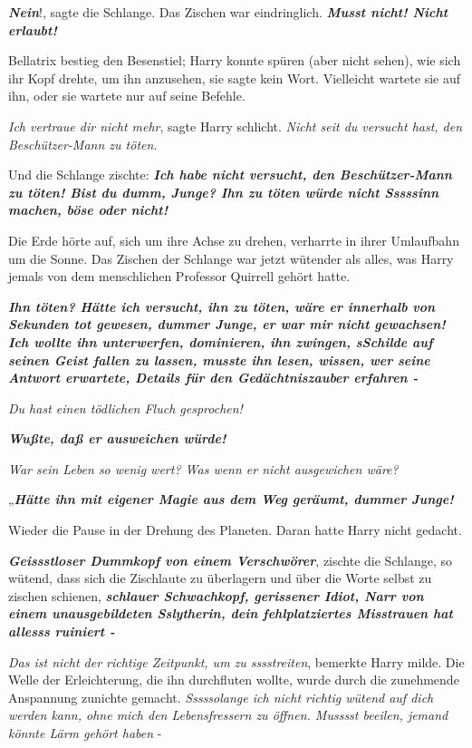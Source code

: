 \glqq{}\textbf{\emph{Nein}}!\grqq{}, sagte die Schlange. Das Zischen war
eindringlich. \glqq{}\textbf{\emph{Musst nicht! Nicht erlaubt!}}\grqq{}

Bellatrix bestieg den Besenstiel; Harry konnte spüren (aber nicht sehen), wie
sich ihr Kopf drehte, um ihn anzusehen, sie sagte kein Wort. Vielleicht wartete
sie auf ihn, oder sie wartete nur auf seine Befehle.

\glqq{}\emph{Ich vertraue dir nicht mehr}\grqq{}, sagte Harry schlicht. \glqq{}
\emph{Nicht seit du versucht hast, den Beschützer-Mann zu töten.}\grqq{}

Und die Schlange zischte: \glqq{}\textbf{\emph{Ich habe nicht versucht, den
Beschützer-Mann zu töten! Bist du dumm, Junge? Ihn zu töten würde nicht Sssssinn
machen, böse oder nicht!}}\grqq{}

Die Erde hörte auf, sich um ihre Achse zu drehen, verharrte in ihrer Umlaufbahn
um die Sonne. Das Zischen der Schlange war jetzt wütender als alles, was Harry
jemals von dem menschlichen Professor Quirrell gehört hatte.

\glqq{}\textbf{\emph{Ihn töten? Hätte ich versucht, ihn zu töten, wäre er
innerhalb von Sekunden tot gewesen, dummer Junge, er war mir nicht gewachsen!
Ich wollte ihn unterwerfen, dominieren, ihn zwingen, sSchilde auf seinen Geist
fallen zu lassen, musste ihn lesen, wissen, wer seine Antwort erwartete, Details
für den Gedächtniszauber erfahren -}}\grqq{}

\glqq{}\emph{Du hast einen tödlichen Fluch gesprochen!}\grqq{}

\glqq{}\textbf{\emph{Wußte, daß er ausweichen würde!}}\grqq{}

\glqq{}\emph{War sein Leben so wenig wert? Was wenn er nicht ausgewichen wäre?}\grqq{}

„\textbf{\emph{Hätte ihn mit eigener Magie aus dem Weg geräumt, dummer
Junge!}}\grqq{}

Wieder die Pause in der Drehung des Planeten. Daran hatte Harry nicht gedacht.

\glqq{}\textbf{\emph{Geissstloser Dummkopf von einem Verschwörer}}\grqq{},
zischte die Schlange, so wütend, dass sich die Zischlaute zu überlagern und über
die Worte selbst zu zischen schienen, \glqq{}\textbf{\emph{schlauer Schwachkopf,
gerissener Idiot, Narr von einem unausgebildeten Sslytherin, dein
fehlplatziertes Misstrauen hat allesss ruiniert -}}\grqq{}

\glqq{}\emph{Das ist nicht der richtige Zeitpunkt, um zu sssstreiten}\grqq{},
bemerkte Harry milde. Die Welle der Erleichterung, die ihn durchfluten wollte,
wurde durch die zunehmende Anspannung zunichte gemacht. \glqq{}\emph{Sssssolange
ich nicht richtig wütend auf dich werden kann, ohne mich den Lebensfressern zu
öffnen. Musssst beeilen, jemand könnte Lärm gehört haben} -\grqq{}

